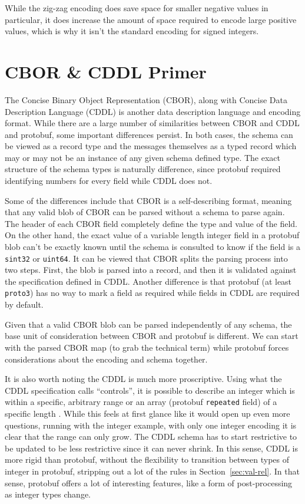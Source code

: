 \documentclass[11pt]{article}
\theoremstyle{definition}
\theoremstyle{plain}
\begin{document}
While the zig-zag encoding does save space for smaller negative values in
particular, it does increase the amount of space required to encode large
positive values, which is why it isn't the standard encoding for signed
integers. 

\section{CBOR \& CDDL Primer}

The Concise Binary Object Representation (CBOR), along with Concise Data
Description Language (CDDL) is another data description language and encoding
format. While there are a large number of similarities between CBOR and CDDL and
protobuf, some important differences persist. In both cases, the schema can be
viewed as a record type and the messages themselves as a typed record which may
or may not be an instance of any given schema defined type. The exact structure
of the schema types is naturally difference, since protobuf required identifying
numbers for every field while CDDL does not.

Some of the differences include that CBOR is a self-describing format, meaning
that any valid blob of CBOR can be parsed without a schema to parse again. The
header of each CBOR field completely define the type and value of the field. On
the other hand, the exact value of a variable length integer field in a protobuf
blob can't be exactly known until the schema is consulted to know if the field
is a \texttt{sint32} or \texttt{uint64}. It can be viewed that CBOR splits the
parsing process into two steps. First, the blob is parsed into a record, and
then it is validated against the specification defined in CDDL. Another
difference is that protobuf (at least \texttt{proto3}) has no way to mark a
field as required while fields in CDDL are required by default.

Given that a valid CBOR blob can be parsed independently of any schema, the base
unit of consideration between CBOR and protobuf is different. We can start with
the parsed CBOR map (to grab the technical term) while protobuf forces
considerations about the encoding and schema together. 

It is also worth noting the CDDL is much more proscriptive. Using what the CDDL
specification calls ``controls'', it is possible to describe an integer which is
within a specific, arbitrary range or an array (protobuf \texttt{repeated}
field) of a specific length \cite{birkholzConciseDataDefinition2019}. While this
feels at first glance like it would open up even more questions, running with
the integer example, with only one integer encoding it is clear that the range
can only grow. The CDDL schema has to start restrictive to be updated to be less
restrictive since it can never shrink. In this sense, CDDL is more rigid than
protobuf, without the flexibility to transition between types of integer in
protobuf, stripping out a lot of the rules in Section~\ref{sec:val-rel}. In that
sense, protobuf offers a lot of interesting features, like a form of
post-processing as integer types change.
\end{document}
